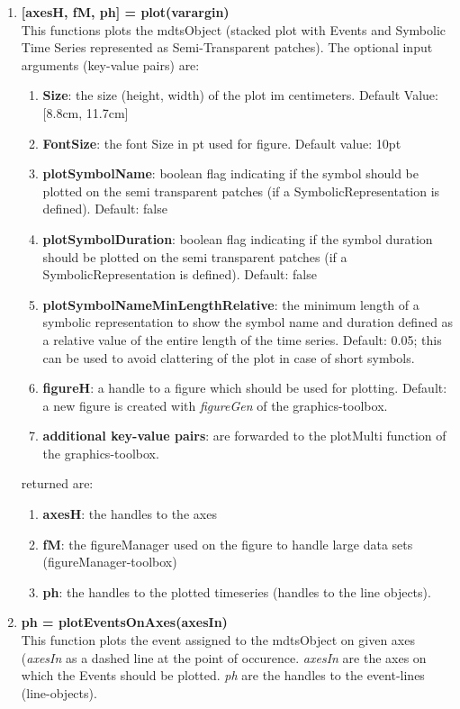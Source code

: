 \documentclass[a4]{scrreprt}
\begin{document}
\begin{enumerate}
\item \textbf{[axesH, fM, ph] = plot(varargin)}\\
This functions plots the mdtsObject (stacked plot with Events and Symbolic Time Series represented as Semi-Transparent patches). The optional input arguments (key-value pairs) are:
	\begin{enumerate}
		\item \textbf{Size}: the size (height, width) of the plot im centimeters. Default Value: [8.8cm, 11.7cm] 
		\item \textbf{FontSize}: the font Size in pt used for figure. Default value: 10pt
		\item \textbf{plotSymbolName}: boolean flag indicating if the symbol should be plotted on the semi transparent patches (if a SymbolicRepresentation is defined). Default: false
		\item \textbf{plotSymbolDuration}: boolean flag indicating if the symbol duration should be plotted on the semi transparent patches (if a SymbolicRepresentation is defined). Default: false
		\item \textbf{plotSymbolNameMinLengthRelative}: the minimum length of a symbolic representation to show the symbol name and duration defined as a relative value of the entire length of the time series. Default: 0.05; this can be used to avoid clattering of the plot in case of short symbols.
		\item \textbf{figureH}: a handle to a figure which should be used for plotting. Default: a new figure is created with \textit{figureGen} of the graphics-toolbox.
		\item \textbf{additional key-value pairs}: are forwarded to the plotMulti function of the graphics-toolbox.
	\end{enumerate}
returned are:
	\begin{enumerate}
		\item \textbf{axesH}: the handles to the axes
		\item \textbf{fM}: the figureManager used on the figure to handle large data sets (figureManager-toolbox)
		\item \textbf{ph}: the handles to the plotted timeseries (handles to the line objects).
	\end{enumerate}

\item \textbf{ph = plotEventsOnAxes(axesIn)}\\
This function plots the event assigned to the mdtsObject on given axes  (\textit{axesIn} as a dashed line at the point of occurence. \textit{axesIn} are the axes on which the Events should be plotted. \textit{ph} are the handles to the event-lines (line-objects).
	

\end{enumerate}
\end{document}
